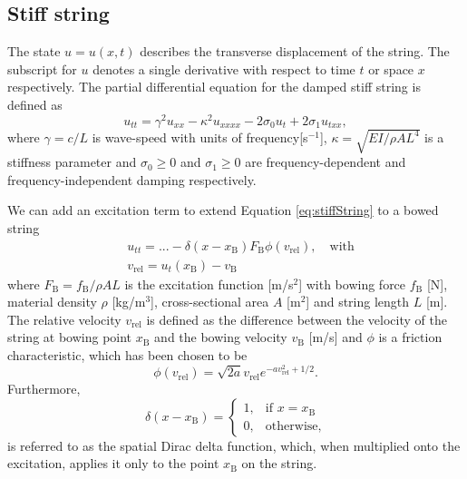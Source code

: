 \documentclass{article}
\begin{document}
\subsection{Stiff string}\label{subsec:stiffStringPDE}
The state $u = u(x,t)$ describes the transverse displacement of the string. The subscript for $u$ denotes a single derivative with respect to time $t$ or space $x$ respectively. The partial differential equation for the damped stiff string is defined as \cite{Bilbao2009:NumericalSoundSynthesis} 
\begin{equation}\label{eq:stiffString}
    u_{tt} = \gamma^2 u_{xx}-\kappa^2u_{xxxx} - 2\sigma_0u_{t} + 2\sigma_1u_{txx},
\end{equation}
where $\gamma = c/L$ is wave-speed with units of frequency[s$^{-1}$], $\kappa = \sqrt{EI/\rho AL^4}$ is a stiffness parameter
and $\sigma_0 \geq 0$ and $\sigma_1 \geq 0$ are frequency-dependent and frequency-independent damping respectively.

We can add an excitation term to extend Equation \eqref{eq:stiffString} to a bowed string \cite{Bilbao2009:NumericalSoundSynthesis} 
\begin{align}
    \label{eq:bowedString} &u_{tt} = ... - \delta(x-x_\text{B})F_\text{B}\phi(v_\text{rel}), \quad \text{with} \\
    &v_\text{rel} = u_t(x_\text{B}) - v_\text{B}
\end{align}
where $F_\text{B} = f_\text{B}/ \rho AL$ is the excitation function [m/s$^2$] with bowing force $f_\text{B}$ [N], material density $\rho$ [kg/m$^3$], cross-sectional area $A$ [m$^2$] and string length $L$ [m]. The relative velocity $v_\text{rel}$ is defined as the difference between the velocity of the string at bowing point $x_\text{B}$ and the bowing velocity $v_\text{B}$ [m/s] and $\phi$ is a friction characteristic, which has been chosen to be \cite{Bilbao2009:NumericalSoundSynthesis}
\begin{equation}
    \phi(v_\text{rel}) = \sqrt{2a}v_\text{rel} e^{-av_\text{rel}^2+1/2}.
\end{equation}
Furthermore,
\begin{equation} \label{eq:dirac}
    \delta(x-x_\text{B}) =
\begin{cases}
    1, & \text{if } x=x_\text{B}\\
    0,              & \text{otherwise},
\end{cases}
\end{equation}
is referred to as the spatial Dirac delta function, which, when multiplied onto the excitation, applies it only to the point $x_\text{B}$ on the string.
\end{document}
